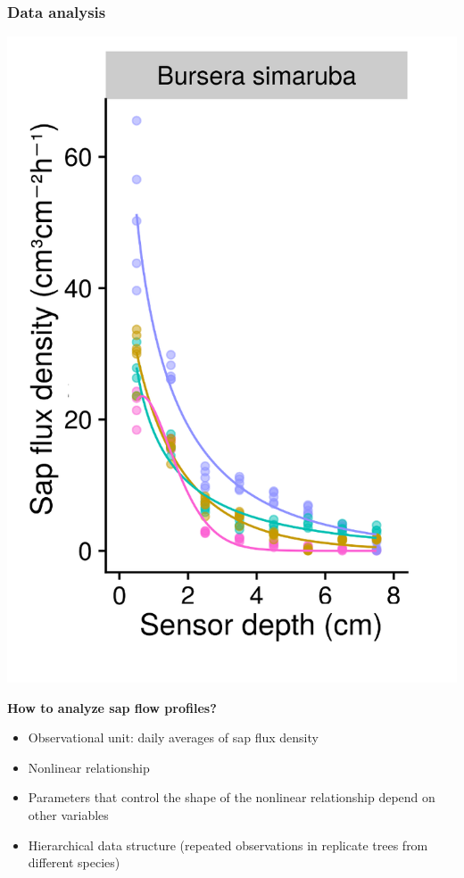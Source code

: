 \documentclass[usepdftitle=false]{beamer}
\newcommand{\Blue}[1]{{\color{blue!50!black}\textbf{#1}}}
\newcommand{\tw}{\textwidth}
\begin{document}
\begin{frame}
	\frametitle{Data analysis}
	\begin{minipage}{0.38\tw}
		\includegraphics[width = \tw]{figures/HFD_05_profile_simarouba.png}
	\end{minipage}
	\begin{minipage}{0.6\tw}		
		   \Blue{How to analyze sap flow profiles?}		
		\begin{itemize}[<+-| alert@+>]
			\item Observational unit: daily averages of sap flux density		
			\item Nonlinear relationship
			\item Parameters that control the shape of the nonlinear relationship depend on other variables
			\item Hierarchical data structure (repeated observations in replicate trees from different species)					
		\end{itemize}
	\end{minipage}
\end{frame}
\end{document}
